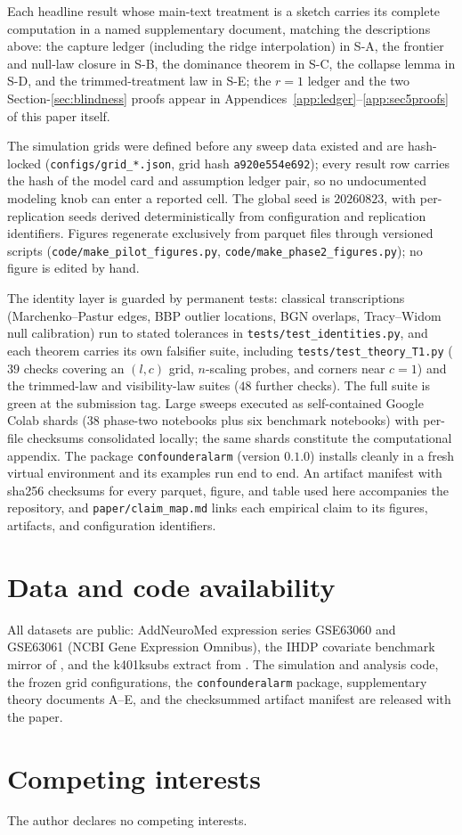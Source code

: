 \documentclass[11pt]{article}
\theoremstyle{definition}
\theoremstyle{remark}
\begin{document}
Each headline result whose main-text treatment is a sketch carries its complete computation in a named supplementary document, matching the descriptions above: the capture ledger (including the ridge interpolation) in S-A, the frontier and null-law closure in S-B, the dominance theorem in S-C, the collapse lemma in S-D, and the trimmed-treatment law in S-E; the $r=1$ ledger and the two Section-\ref{sec:blindness} proofs appear in Appendices~\ref{app:ledger}--\ref{app:sec5proofs} of this paper itself.


The simulation grids were defined before any sweep data existed and are hash-locked (\texttt{configs/grid\_*.json}, grid hash \texttt{a920e554e692}); every result row carries the hash of the model card and assumption ledger pair, so no undocumented modeling knob can enter a reported cell. The global seed is $20260823$, with per-replication seeds derived deterministically from configuration and replication identifiers. Figures regenerate exclusively from parquet files through versioned scripts (\texttt{code/make\_pilot\_figures.py}, \texttt{code/make\_phase2\_figures.py}); no figure is edited by hand.

The identity layer is guarded by permanent tests: classical transcriptions (Marchenko--Pastur edges, BBP outlier locations, BGN overlaps, Tracy--Widom null calibration) run to stated tolerances in \texttt{tests/test\_identities.py}, and each theorem carries its own falsifier suite, including \texttt{tests/test\_theory\_T1.py} ($39$ checks covering an $(l,c)$ grid, $n$-scaling probes, and corners near $c=1$) and the trimmed-law and visibility-law suites ($48$ further checks). The full suite is green at the submission tag. Large sweeps executed as self-contained Google Colab shards ($38$ phase-two notebooks plus six benchmark notebooks) with per-file checksums consolidated locally; the same shards constitute the computational appendix. The package \texttt{confounderalarm} (version $0.1.0$) installs cleanly in a fresh virtual environment and its examples run end to end. An artifact manifest with sha256 checksums for every parquet, figure, and table used here accompanies the repository, and \texttt{paper/claim\_map.md} links each empirical claim to its figures, artifacts, and configuration identifiers.

\section*{Data and code availability}
All datasets are public: AddNeuroMed expression series GSE63060 and GSE63061 (NCBI Gene Expression Omnibus), the IHDP covariate benchmark mirror of \citet{hill2011bayesian}, and the k401ksubs extract from \citet{wooldridge2016introductory}. The simulation and analysis code, the frozen grid configurations, the \texttt{confounderalarm} package, supplementary theory documents A--E, and the checksummed artifact manifest are released with the paper.

\section*{Competing interests}
The author declares no competing interests.



\end{document}
